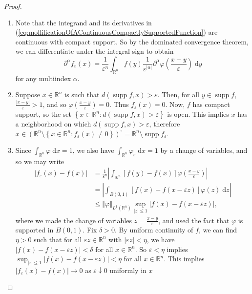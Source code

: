 \documentclass{book}
\newcommand{\bbR}{\mathbb{R}}
\renewcommand{\d}{\mathrm{d}}
\renewcommand{\epsilon}{\varepsilon}
\renewcommand{\phi}{\varphi}
\newcommand{\abs}[1]{\left\lvert {#1} \right\rvert}
\newcommand{\norm}[1]{\left\Vert {#1} \right\Vert}
\newcommand{\set}[1]{\left\{ {#1} \right\}}
\DeclareMathOperator{\supp}{supp}
\theoremstyle{definition}
\theoremstyle{remark}
\numberwithin{equation}{chapter}
\begin{document}
\begin{proof}
    \begin{enumerate}[label=(\roman*)]
        \item Note that the integrand and its derivatives in (\ref{eq:mollificationOfAContinuousCompactlySupportedFunction}) are continuous with compact support. So by the dominated convergence theorem, we can differentiate under the integral sign to obtain
        \begin{equation}
            \partial^\alpha f_\epsilon(x) = \frac{1}{\epsilon^n} \int_{\bbR^n} f(y) \frac{1}{\epsilon^{\abs{\alpha}}} \partial^\alpha\phi\left(\frac{x-y}{\epsilon}\right) \; \d y
        \end{equation}
        for any multiindex $\alpha$.

        \item Suppose $x \in \bbR^n$ is such that $d(\supp{f},x) > \epsilon$. Then, for all $y \in \supp{f}$, $\frac{\abs{x-y}}{\epsilon} > 1$, and so $\phi\left( \frac{x-y}{\epsilon} \right) = 0$. Thus $f_\epsilon(x) = 0$. Now, $f$ has compact support, so the set $\set{ x \in \bbR^n : d(\supp{f},x) > \epsilon }$ is open. This implies $x$ has a neighborhood on which $d(\supp{f},x) > \epsilon$, therefore $x \in (\bbR^n \setminus \set{ x \in \bbR^n : f_\epsilon(x) \neq 0 })^\circ = \bbR^n \setminus \supp{f_\epsilon}$.
        
        \item Since $\int_{\bbR^n} \phi \; \d x = 1$, we also have $\int_{\bbR^n} \phi_{\epsilon} \; \d x = 1$ by a change of variables, and so we may write
        \begin{equation} \begin{aligned}
            \abs{ f_\epsilon(x) - f(x) } &= \frac{1}{\epsilon^n} \abs{ \int_{\bbR^n} [f(y) - f(x)]\phi\left( \frac{x-y}{\epsilon} \right) } \\
                                         &= \abs{ \int_{B(0,1)} [f(x) - f(x-\epsilon z)]\phi(z) \; \d z }                                   \\
                                         &\leq \norm{\phi}_{L^1(\bbR^n)} \sup_{\abs{z} \leq 1} \abs{ f(x) - f(x-\epsilon z) },
        \end{aligned} \end{equation}
        where we made the change of variables $z = \frac{x-y}{\epsilon}$, and used the fact that $\phi$ is supported in $B(0,1)$. Fix $\delta > 0$. By uniform continuity of $f$, we can find $\eta > 0$ such that for all $\epsilon z \in \bbR^n$ with $\abs{\epsilon z} < \eta$, we have $\abs{ f(x) - f(x - \epsilon z) } < \delta$ for all $x \in \bbR^n$. So $\epsilon < \eta$ implies $\sup_{\abs{z} \leq 1} \abs{ f(x) - f(x-\epsilon z) } < \eta$ for all $x \in \bbR^n$. This implies $\abs{ f_\epsilon(x) - f(x) } \rightarrow 0 $ as $\epsilon \downarrow 0$ uniformly in $x$
    \end{enumerate}
\end{proof}
\end{document}
